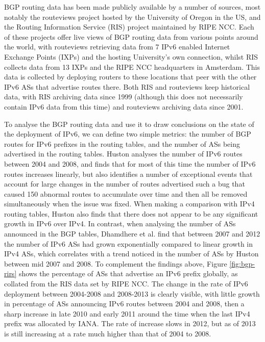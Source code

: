 BGP routing data has been made publicly available by a number of sources, most
notably the routeviews\cite{meyer_route_2005} project hosted by the University of Oregon in the
US, and the Routing Information Service (RIS) project maintained by RIPE
NCC\cite{ripe_ncc_routing_????}.
Each of these projects offer live views of BGP routing data from various points
around the world, with routeviews retrieving data from 7 IPv6 enabled Internet
Exchange Points (IXPs) and the hosting University's own connection, whilst RIS
collects data from 13 IXPs and the RIPE NCC headquarters in Amsterdam. This data
is collected by deploying routers to these locations that peer with the other
IPv6 ASs that advertise routes there. Both RIS and routeviews keep historical data, with RIS
archiving data since 1999 (although this does not necessarily contain IPv6 data
from this time) and routeviews archiving data since 2001. 

To analyse the BGP routing data and use it to draw conclusions on the state of
the deployment of IPv6, we can define two simple metrics: the number of BGP
routes for IPv6 prefixes in the routing tables, and the number of ASs being
advertised in the routing tables. Huston analyses the number of IPv6 routes
between 2004 and 2008, and finds that for most of this time the number of IPv6
routes increases linearly, but also identifies a number of exceptional events that
account for large changes in the number of routes advertised such a bug that
caused 150 abnormal routes to accumulate over time and then all be removed
simultaneously when the issue was fixed\cite{huston_ipv6_2008}. When making a comparison with IPv4
routing tables, Huston also finds that there does not appear to be any
significant growth in IPv6 over IPv4. In contrast, when analysing the number of ASs announced
in the BGP tables, Dhamdhere et al. find that between 2007 and 2012 the number
of IPv6 ASs had grown exponentially compared to linear growth in IPv4 ASs, which
correlates with a trend noticed in the number of ASs by Huston between mid 2007
and 2008\cite{dhamdhere_measuring_2012}. To complement the findings above, Figure \ref{fig:bgp-rirs} shows the percentage
of ASs that advertise an IPv6 prefix globally, as collated from the RIS data set
by RIPE NCC. The change in the rate of IPv6 deployment between 2004-2008 and
2008-2013 is clearly visible, with little growth in percentage of ASs
announcing IPv6 routes between 2004 and 2008, then a sharp increase in late 2010
and early 2011 around the time when the last IPv4 prefix was allocated by IANA.
The rate of increase slows in 2012, but as of 2013 is still increasing at a rate
much higher than that of 2004 to 2008.

